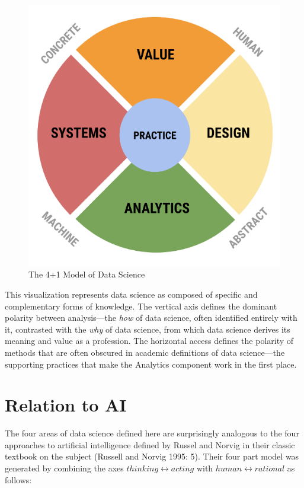 \documentclass[
  letterpaper,
]{report}
\begin{document}
\begin{figure}

{\centering \includegraphics{chapters/02_Structure/images/image5.png}

}

\caption{The 4+1 Model of Data Science}

\end{figure}

This visualization represents data science as composed of specific and
complementary forms of knowledge. The vertical axis defines the dominant
polarity between analysis---the \emph{how} of data science, often
identified entirely with it, contrasted with the \emph{why} of data
science, from which data science derives its meaning and value as a
profession. The horizontal access defines the polarity of methods that
are often obscured in academic definitions of data science---the
supporting practices that make the Analytics component work in the first
place.

\hypertarget{relation-to-ai}{%
\chapter{Relation to AI}\label{relation-to-ai}}

The four areas of data science defined here are surprisingly analogous
to the four approaches to artificial intelligence defined by Russel and
Norvig in their classic textbook on the subject (Russell and Norvig
1995: 5). Their four part model was generated by combining the axes
\(thinking \leftrightarrow acting\) with
\(human \leftrightarrow rational\) as follows:
\end{document}
